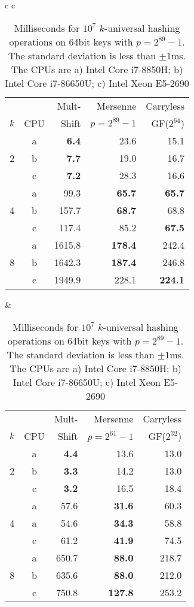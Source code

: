 \begin{table}[H]
   \centering
   \begin{tabular}{c c}
      \begin{tabular}{r c | r r r}
          &  &  Mult- & Mersenne       & Carryless \\
          $k$   & CPU & Shift & $p=2^{89}-1$ & GF($2^{64}$) \\
         \hline
           & a & \textbf{6.4} & 23.6 & 15.1 \\
         2 & b & \textbf{7.7} & 19.0 & 16.7 \\
           & c & \textbf{7.2} & 28.3 & 16.6 \\
         \hline
           & a & 99.3 & \textbf{65.7} & \textbf{65.7} \\
         4 & b & 157.7 &\textbf{68.7}  & 68.8 \\
           & c & 117.4 & 85.2 & \textbf{67.5}\\
         \hline
             & a & 1615.8 & \textbf{178.4} & 242.4 \\
         8 & b &  1642.3 & \textbf{187.4} & 246.8 \\
           & c & 1949.9 & 228.1 & \textbf{224.1} \\
      \end{tabular}
      &
      \begin{tabular}{r c | r r r}
          &  &  Mult- & Mersenne       & Carryless \\
          $k$   & CPU & Shift & $p=2^{61}-1$ & GF($2^{32}$) \\
         \hline
             & a & \textbf{4.4} & 13.6 & 13.0 \\
         2 & b & \textbf{3.3} & 14.2 & 13.0 \\
           & c & \textbf{3.2} & 16.5 & 18.4 \\
         \hline
           & a & 57.6 & \textbf{31.6} & 60.3 \\
         4 & a & 54.6 & \textbf{34.3}  & 58.8 \\
           & c & 61.2 & \textbf{41.9} & 74.5 \\
         \hline
           & a & 650.7 & \textbf{88.0} & 218.7 \\
         8 & b & 635.6 & \textbf{88.0} & 212.0 \\
           & c & 750.8 & \textbf{127.8} & 253.2 \\
      \end{tabular}
   \end{tabular}
   \caption{Milliseconds for $10^7$ $k$-universal hashing operations on 64bit keys with $p=2^{89}-1$.
      The standard deviation is less than $\pm1$ms.
      The CPUs are
         a) Intel Core i7-8850H; %
         b) Intel Core i7-86650U; %
         c) Intel Xeon E5-2690 %
   }
   \label{tab:hashing-experiments}
\end{table}

